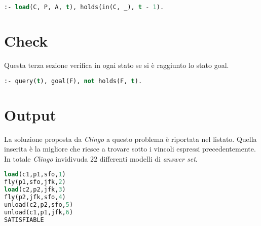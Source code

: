 \documentclass[12pt]{report}
\begin{document}
\begin{lstlisting}[language=lisp]
:- load(C, P, A, t), holds(in(C, _), t - 1).
\end{lstlisting}

\section{Check}
Questa terza sezione verifica in ogni stato se si è raggiunto lo stato goal.

\begin{lstlisting}[language=lisp]
:- query(t), goal(F), not holds(F, t).
\end{lstlisting}

\section{Output}
La soluzione proposta da \emph{Clingo} a questo problema è riportata nel listato. Quella inserita è la migliore che riesce a trovare sotto i vincoli espressi precedentemente. In totale \emph{Clingo} invidivuda $22$ differenti modelli di \emph{answer set}.

\begin{lstlisting}[language=lisp]
load(c1,p1,sfo,1)
fly(p1,sfo,jfk,2)
load(c2,p2,jfk,3)
fly(p2,jfk,sfo,4)
unload(c2,p2,sfo,5)
unload(c1,p1,jfk,6)
SATISFIABLE
\end{lstlisting}
\end{document}
